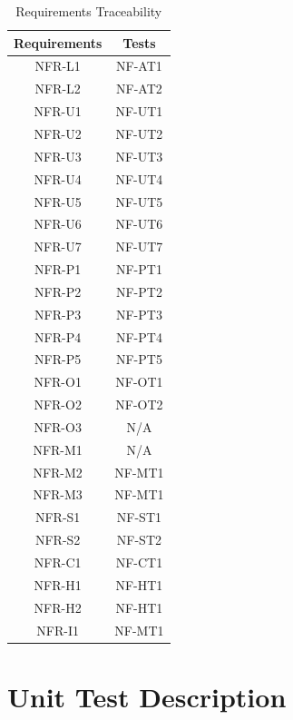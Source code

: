 \documentclass[12pt, titlepage]{article}
\begin{document}
\begin{table}[H]
	\centering
	\caption{Requirements Traceability}
	\label{my-label}
	\begin{tabular}{|c|c|}
		\hline
		\textbf{Requirements} & \textbf{Tests} \\ \hline
		NFR-L1 & NF-AT1 \\ \hline
    NFR-L2 & NF-AT2 \\ \hline
    NFR-U1 & NF-UT1 \\ \hline
    NFR-U2 & NF-UT2 \\ \hline
    NFR-U3 & NF-UT3 \\ \hline
    NFR-U4 & NF-UT4 \\ \hline
    NFR-U5 & NF-UT5\\ \hline
    NFR-U6 & NF-UT6 \\ \hline
    NFR-U7 & NF-UT7 \\ \hline
    NFR-P1 & NF-PT1 \\ \hline
    NFR-P2 & NF-PT2 \\ \hline
    NFR-P3 & NF-PT3 \\ \hline
    NFR-P4 & NF-PT4 \\ \hline
    NFR-P5 & NF-PT5 \\ \hline
    NFR-O1 & NF-OT1 \\ \hline
    NFR-O2 & NF-OT2 \\ \hline
    NFR-O3 & N/A \\ \hline
    NFR-M1 & N/A \\ \hline
    NFR-M2 & NF-MT1 \\ \hline
    NFR-M3 & NF-MT1 \\ \hline
    NFR-S1 & NF-ST1 \\ \hline
    NFR-S2 & NF-ST2 \\ \hline
    NFR-C1 & NF-CT1 \\ \hline
    NFR-H1 & NF-HT1 \\ \hline
    NFR-H2 & NF-HT1 \\ \hline
    NFR-I1 & NF-MT1 \\ \hline
	\end{tabular}
\end{table}


\section{Unit Test Description}
\end{document}
